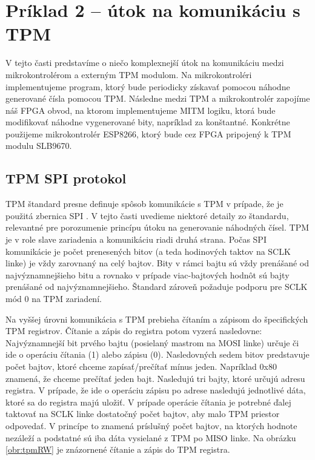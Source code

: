 \section{Príklad 2 -- útok na komunikáciu s TPM} \label{sek:example2}
V tejto časti predstavíme o niečo komplexnejší útok na komunikáciu medzi mikrokontrolérom a externým TPM modulom. Na mikrokontroléri implementujeme program, ktorý bude periodicky získavať pomocou náhodne generované čísla pomocou TPM. Následne medzi TPM a mikrokontrolér zapojíme náš FPGA obvod, na ktorom implementujeme MITM logiku, ktorá bude modifikovať náhodne vygenerované bity, napríklad za konštantné. Konkrétne použijeme mikrokontrolér ESP8266, ktorý bude cez FPGA pripojený k TPM modulu SLB9670.

\subsection{TPM SPI protokol}
TPM štandard presne definuje spôsob komunikácie s TPM v prípade, že je použitá zbernica SPI \cite{tpmTis}. V tejto časti uvedieme niektoré detaily zo štandardu, relevantné pre porozumenie princípu útoku na generovanie náhodných čísel. TPM je v role slave zariadenia a komunikáciu riadi druhá strana. Počas SPI komunikácie je počet prenesených bitov (a teda hodinových taktov na SCLK linke) je vždy zarovnaný na celý bajtov. Bity v rámci bajtu sú vždy prenášané od najvýznamnejšieho bitu a rovnako v prípade viac-bajtových hodnôt sú bajty prenášané od najvýznamnejšieho. Štandard zároveň požaduje podporu pre SCLK mód 0 na TPM zariadení.

Na vyššej úrovni komunikácia s TPM prebieha čítaním a zápisom do špecifických TPM registrov. Čítanie a zápis do registra potom vyzerá nasledovne: Najvýznamnejší bit prvého bajtu (posielaný mastrom na MOSI linke) určuje či ide o operáciu čítania (1) alebo zápisu (0). Nasledovných sedem bitov predstavuje počet bajtov, ktoré chceme zapísať/prečítať mínus jeden. Napríklad 0x80 znamená, že chceme prečítať jeden bajt. Nasledujú tri bajty, ktoré určujú adresu registra. V prípade, že ide o operáciu zápisu po adrese nasledujú jednotlivé dáta, ktoré sa do registra majú uložiť. V prípade operácie čítania je potrebné ďalej taktovať na SCLK linke dostatočný počet bajtov, aby malo TPM priestor odpovedať. V princípe to znamená  príslušný počet bajtov, na ktorých hodnote nezáleží a podstatné sú iba dáta vysielané z TPM po MISO linke. Na obrázku \ref{obr:tpmRW} je znázornené čítanie a zápis do TPM registra.

